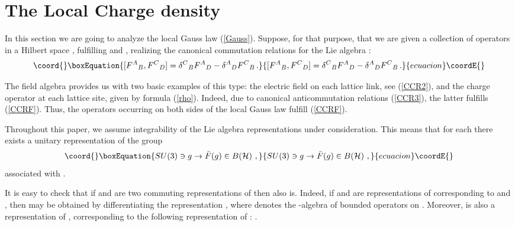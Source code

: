 \documentclass[a4paper,12pt]{article}
\begin{document}
\setcounter{equation}{0}
\section{The Local Charge density}
\label{Gauss Law}


In this section we are going to analyze the local Gauss law
(\ref{Gauss}). Suppose, for that purpose, that we are given a
collection of operators \coordHE{} in a Hilbert space \coordHE{},
fulfilling \coordHE{} and \coordHE{}, realizing
the canonical commutation relations for the Lie algebra \coordHE{}:
\begin{equation}\coord{}\boxEquation{
\label{CCRF} [{F^A}_B , {F^C}_D] = {\delta^C}_B {F^A}_D  -
{\delta^A}_D {F^C}_B  \, .
}{
[{F^A}_B , {F^C}_D] = {\delta^C}_B {F^A}_D  -
{\delta^A}_D {F^C}_B  \, .
}{ecuacion}\coordE{}\end{equation}

The field algebra  \coordHE{} provides us with two basic
examples of this type: the electric field \coordHE{} on each
lattice link, see (\ref{CCR2}), and the charge operator
\coordHE{} at each lattice site, given by formula
(\ref{rho}). Indeed, due to canonical anticommutation relations
(\ref{CCR3}), the latter fulfills (\ref{CCRF}). Thus, the
operators occurring on both sides of the local Gauss law fulfill
(\ref{CCRF}).

Throughout this paper, we assume integrability of the Lie algebra
representations under consideration. This means that for each \coordHE{}
there exists a unitary representation of the group \coordHE{}
\begin{equation}\coord{}\boxEquation{
SU(3) \ni g \rightarrow {\bar F}(g) \in B({\cal H}) \ ,
}{
SU(3) \ni g \rightarrow {\bar F}(g) \in B({\cal H}) \ ,
}{ecuacion}\coordE{}\end{equation}
associated with \coordHE{}.

It is easy to check that if \coordHE{} and \coordHE{} are two commuting
representations of \coordHE{} then also \coordHE{} is. Indeed, if \coordHE{} and \coordHE{} are representations of \coordHE{}
corresponding to \coordHE{} and \coordHE{}, then \coordHE{} may be obtained by
differentiating the representation \coordHE{}, where \coordHE{} denotes
the \coordHE{}-algebra of bounded operators on \coordHE{}. Moreover,
\coordHE{} is also a representation of \coordHE{}, corresponding to the
following representation of \coordHE{}: \coordHE{}.
\end{document}
